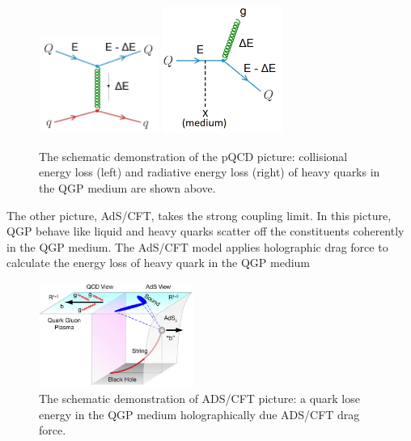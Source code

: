  \begin{figure}[hbtp]
\begin{center}
\includegraphics[width=0.35\textwidth]{Figures/Chapter1/Collisional.png}
\includegraphics[width=0.35\textwidth]{Figures/Chapter1/Radiative.png}
\caption{The schematic demonstration of the pQCD picture: collisional energy loss (left) and radiative energy loss (right) of heavy quarks in the QGP medium are shown above.}
\label{HQELosspQCD}
\end{center}
\end{figure}   

The other picture, AdS/CFT, takes the strong coupling limit. In this picture, QGP behave like liquid and heavy quarks scatter off the constituents coherently in the QGP medium. The AdS/CFT model applies holographic drag force \cite{ADSCFTDrag} to calculate the energy loss of heavy quark \cite{HQHoloELoss} in the QGP medium

 \begin{figure}[hbtp]
\begin{center}
\includegraphics[width=0.45\textwidth]{Figures/Chapter1/ADSCFT.png}
\caption{The schematic demonstration of ADS/CFT picture: a quark lose energy in the QGP medium holographically due ADS/CFT drag force.}
\label{ADCCFT}
\end{center}
\end{figure}  

